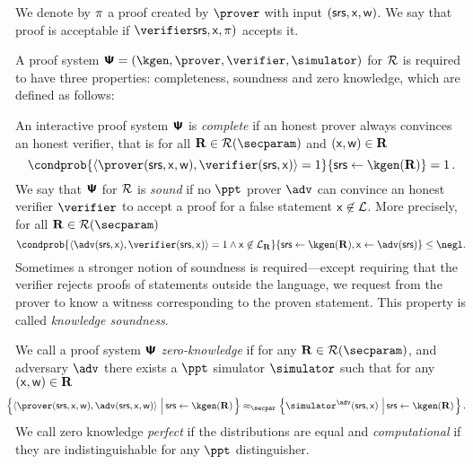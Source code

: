 We denote by $\pi$ a proof created by $\prover$ with input
$(\mathsf{srs}, \mathsf{x}, \mathsf{w})$. We say that proof is acceptable if $\verifier \srs, \inp, \zkproof)$ accepts it. 

A proof system $\proofsystem = (\kgen, \prover, \verifier, \simulator)$ for $\mathcal{R}$ is
required to have three properties: completeness, soundness and zero knowledge, which are
defined as follows:

  An interactive proof system $\bm{\mathsf{\Psi}}$ is
  \emph{complete} if an honest prover always convinces an honest verifier, that
  is for all $\REL \in \RELGEN(\secparam)$ and $(\mathsf{x}, \mathsf{w}) \in \mathbf{R}$
	\[
		\condprob{\ip{\prover (\srs, \inp, \wit)}{\verifier (\srs,
        \inp)} = 1}{\srs \gets \kgen(\REL)} = 1\,.
	\]
    We say that $\bm{\mathsf{\Psi}}$ for $\mathcal{R}$ is \emph{sound} if no
  $\ppt$ prover $\adv$ can convince an honest verifier $\verifier$ to accept a
  proof for a false statement $\mathsf{x} \not\in\mathcal{L}$. More precisely, for
  all $\REL \in \RELGEN(\secparam)$
	\[
    \condprob{\ip{\adv(\srs, \inp)}{\verifier(\srs, \inp)} = 1 \land \inp
      \not\in \LANG_\REL}{\srs \gets \kgen(\REL), \inp \gets \adv(\srs)} \leq
    \negl.
	\]
Sometimes a stronger notion of soundness is required---except requiring that the
verifier rejects proofs of statements outside the language, we request from the
prover to know a witness corresponding to the proven statement. This property is
called \emph{knowledge soundness}.%
 
  We call a proof system $\bm{\mathsf{\Psi}}$
\emph{zero-knowledge} if for any $\REL \in \RELGEN(\secparam)$, and adversary
$\adv$ there exists a $\ppt$ simulator $\simulator$ such that for any
$(\mathsf{x}, \mathsf{w}) \in \mathbf{R}$
\begin{multline*}
\hspace{-10pt}	  \left\{\ip{\prover(\srs, \inp, \wit)}{\adv(\srs, \inp, \wit)}
      \,\left|\, \srs \gets \kgen(\REL)\COMMENT{, (\inp, \wit) \gets \adv(\REL,
          \srs)}\vphantom{\simulator^\adv}\right.\right\} \approx_\secpar
		\left\{\simulator^{\adv}(\srs, \inp)\,\left|\, \srs \gets
        \kgen(\REL)\COMMENT{, (\inp, \wit) \gets \adv(\REL,
          \srs)}\vphantom{\simulator^\adv}\right.\right\}.
\end{multline*}
We call zero knowledge \emph{perfect} if the distributions are equal and
\emph{computational} if they are indistinguishable for any $\ppt$ distinguisher.

